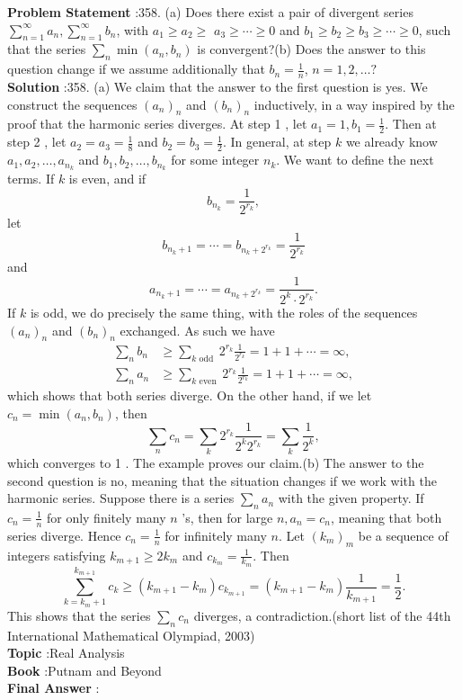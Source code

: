 \documentclass[10pt]{article}
\begin{document}
\textbf{Problem Statement} :358. (a) Does there exist a pair of divergent series $\sum_{n=1}^{\infty} a_{n}, \sum_{n=1}^{\infty} b_{n}$, with $a_{1} \geq a_{2} \geq$ $a_{3} \geq \cdots \geq 0$ and $b_{1} \geq b_{2} \geq b_{3} \geq \cdots \geq 0$, such that the series $\sum_{n} \min \left(a_{n}, b_{n}\right)$ is convergent?(b) Does the answer to this question change if we assume additionally that $b_{n}=\frac{1}{n}$, $n=1,2, \ldots ?$ \\
\textbf{Solution} :358. (a) We claim that the answer to the first question is yes. We construct the sequences $\left(a_{n}\right)_{n}$ and $\left(b_{n}\right)_{n}$ inductively, in a way inspired by the proof that the harmonic series diverges. At step 1 , let $a_{1}=1, b_{1}=\frac{1}{2}$. Then at step 2 , let $a_{2}=a_{3}=\frac{1}{8}$ and $b_{2}=b_{3}=\frac{1}{2}$. In general, at step $k$ we already know $a_{1}, a_{2}, \ldots, a_{n_{k}}$ and $b_{1}, b_{2}, \ldots, b_{n_{k}}$ for some integer $n_{k}$. We want to define the next terms. If $k$ is even, and if$$ b_{n_{k}}=\frac{1}{2^{r_{k}}}, $$let$$ b_{n_{k}+1}=\cdots=b_{n_{k}+2^{r_{k}}}=\frac{1}{2^{r_{k}}} $$and$$ a_{n_{k}+1}=\cdots=a_{n_{k}+2^{r_{k}}}=\frac{1}{2^{k} \cdot 2^{r_{k}}} . $$If $k$ is odd, we do precisely the same thing, with the roles of the sequences $\left(a_{n}\right)_{n}$ and $\left(b_{n}\right)_{n}$ exchanged. As such we have$$ \begin{aligned} \sum_{n} b_{n} & \geq \sum_{k \text { odd }} 2^{r_{k}} \frac{1}{2^{r_{k}}}=1+1+\cdots=\infty, \\ \sum_{n} a_{n} & \geq \sum_{k \text { even }} 2^{r_{k}} \frac{1}{2^{r_{k}}}=1+1+\cdots=\infty, \end{aligned} $$which shows that both series diverge. On the other hand, if we let $c_{n}=\min \left(a_{n}, b_{n}\right)$, then$$ \sum_{n} c_{n}=\sum_{k} 2^{r_{k}} \frac{1}{2^{k} 2^{r_{k}}}=\sum_{k} \frac{1}{2^{k}}, $$which converges to 1 . The example proves our claim.(b) The answer to the second question is no, meaning that the situation changes if we work with the harmonic series. Suppose there is a series $\sum_{n} a_{n}$ with the given property. If $c_{n}=\frac{1}{n}$ for only finitely many $n$ 's, then for large $n, a_{n}=c_{n}$, meaning that both series diverge. Hence $c_{n}=\frac{1}{n}$ for infinitely many $n$. Let $\left(k_{m}\right)_{m}$ be a sequence of integers satisfying $k_{m+1} \geq 2 k_{m}$ and $c_{k_{m}}=\frac{1}{k_{m}}$. Then$$ \sum_{k=k_{m}+1}^{k_{m+1}} c_{k} \geq\left(k_{m+1}-k_{m}\right) c_{k_{m+1}}=\left(k_{m+1}-k_{m}\right) \frac{1}{k_{m+1}}=\frac{1}{2} . $$This shows that the series $\sum_{n} c_{n}$ diverges, a contradiction.(short list of the 44th International Mathematical Olympiad, 2003)\\
\textbf{Topic} :Real Analysis\\
\textbf{Book} :Putnam and Beyond\\
\textbf{Final Answer} :\\
\end{document}
